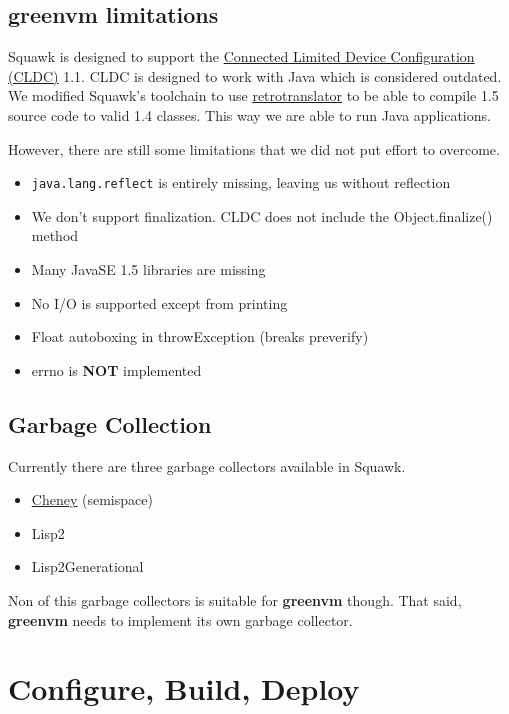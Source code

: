 \documentclass[
a4paper,
12pt,
]{report}
\newcommand{\gvm}{{\fontfamily{fco}\selectfont\textbf{\color{g}green\color{v}vm}}\xspace}
\newcommand{\java}{Java\texttrademark\xspace}
\begin{document}
\section{\gvm limitations}

Squawk is designed to support the
\href{https://en.wikipedia.org/wiki/CLDC}{Connected Limited Device
  Configuration (CLDC)} 1.1.  CLDC is designed to work with \java 1.4
which is considered outdated.  We modified Squawk's toolchain to use
\href{http://retrotranslator.sourceforge.net/}{retrotranslator} to be
able to compile 1.5 source code to valid 1.4 classes.  This way we are
able to run \java 1.5 applications.

However, there are still some limitations that we did not put effort
to overcome.

\begin{itemize}
\item \verb!java.lang.reflect! is entirely missing, leaving us without
  reflection
\item We don't support finalization. CLDC does not include the
  Object.finalize() method
\item Many JavaSE 1.5 libraries are missing
\item No I/O is supported except from printing
\item Float autoboxing in throwException (breaks preverify)
\item errno is \textbf{NOT} implemented

\end{itemize}

\section{Garbage Collection}

Currently there are three garbage collectors available in Squawk.

\begin{itemize}
\item \href{https://en.wikipedia.org/wiki/Cheney%27s_algorithm}{Cheney} (semispace)
\item Lisp2
\item Lisp2Generational
\end{itemize}

Non of this garbage collectors is suitable for \gvm though. That said,
\gvm needs to implement its own garbage collector. 

\chapter{Configure, Build, Deploy}
\end{document}

